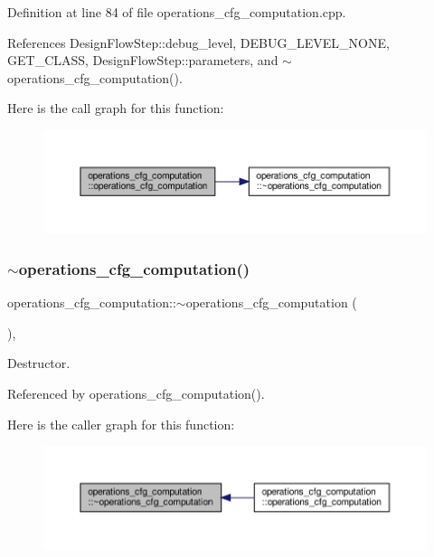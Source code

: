 Definition at line 84 of file operations\+\_\+cfg\+\_\+computation.\+cpp.



References Design\+Flow\+Step\+::debug\+\_\+level, D\+E\+B\+U\+G\+\_\+\+L\+E\+V\+E\+L\+\_\+\+N\+O\+NE, G\+E\+T\+\_\+\+C\+L\+A\+SS, Design\+Flow\+Step\+::parameters, and $\sim$operations\+\_\+cfg\+\_\+computation().

Here is the call graph for this function\+:
\nopagebreak
\begin{figure}[H]
\begin{center}
\leavevmode
\includegraphics[width=350pt]{d0/d11/classoperations__cfg__computation_a73fb897b367730b68b708905638fd29b_cgraph}
\end{center}
\end{figure}
\mbox{\label{classoperations__cfg__computation_ae8176a7b01ff9965351b3dc47c3cf5ad}} 
\subsubsection{\texorpdfstring{$\sim$operations\+\_\+cfg\+\_\+computation()}{~operations\_cfg\_computation()}}
{\footnotesize\ttfamily operations\+\_\+cfg\+\_\+computation\+::$\sim$operations\+\_\+cfg\+\_\+computation (\begin{DoxyParamCaption}{ }\end{DoxyParamCaption})\hspace{0.3cm}{\ttfamily [override]}, {\ttfamily [default]}}



Destructor. 



Referenced by operations\+\_\+cfg\+\_\+computation().

Here is the caller graph for this function\+:
\nopagebreak
\begin{figure}[H]
\begin{center}
\leavevmode
\includegraphics[width=350pt]{d0/d11/classoperations__cfg__computation_ae8176a7b01ff9965351b3dc47c3cf5ad_icgraph}
\end{center}
\end{figure}


